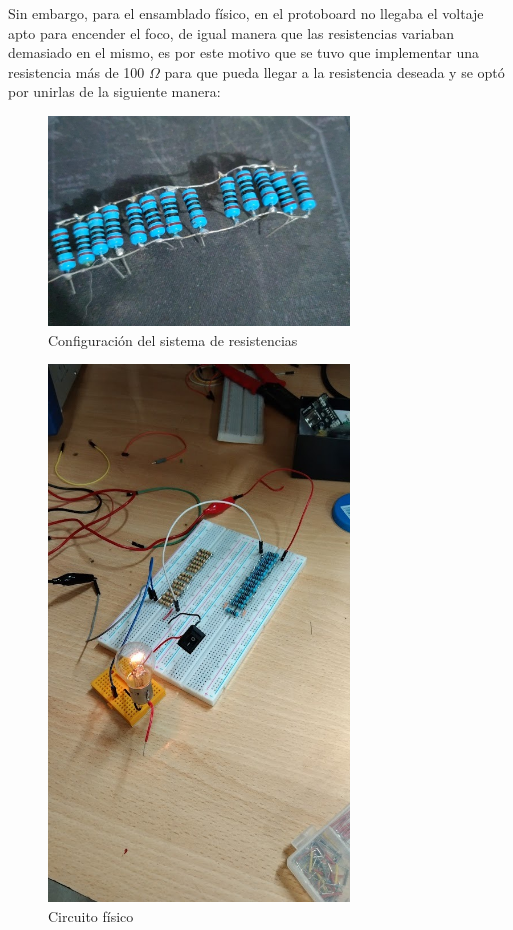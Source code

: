 \documentclass[]{article}
\begin{document}
Sin embargo, para el ensamblado físico, en el protoboard no llegaba el voltaje apto para encender el foco, de igual manera que las resistencias variaban demasiado en el mismo, es 
por este motivo que se tuvo que implementar una resistencia más de 100 $\Omega$ para que pueda llegar a la resistencia deseada y se optó por unirlas de la siguiente manera:

\begin{figure}[htb]
    \centering
    \includegraphics[width=8cm]{build/Imagenes/Resistencias.jpg}
    \caption{Configuración del sistema de resistencias}
\end{figure}

\begin{figure}[htb]
    \centering
    \includegraphics[width=8cm]{build/Imagenes/CircuitoFin1.jpg}
    \caption{Circuito físico}
\end{figure}
\end{document}

